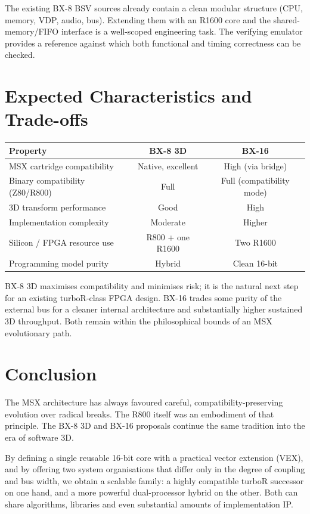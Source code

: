 \documentclass[11pt,a4paper]{article}
\begin{document}
The existing BX-8 BSV sources already contain a clean modular structure (CPU, memory, VDP, audio, bus). Extending them with an R1600 core and the shared-memory/FIFO interface is a well-scoped engineering task. The verifying emulator provides a reference against which both functional and timing correctness can be checked.

\section{Expected Characteristics and Trade-offs}

\begin{center}
\begin{tabular}{@{}lcc@{}}
\toprule
Property & BX-8 3D & BX-16 \\
\midrule
MSX cartridge compatibility & Native, excellent & High (via bridge) \\
Binary compatibility (Z80/R800) & Full & Full (compatibility mode) \\
3D transform performance & Good & High \\
Implementation complexity & Moderate & Higher \\
Silicon / FPGA resource use & R800 + one R1600 & Two R1600 \\
Programming model purity & Hybrid & Clean 16-bit \\
\bottomrule
\end{tabular}
\end{center}

BX-8 3D maximises compatibility and minimises risk; it is the natural next step for an existing turboR-class FPGA design. BX-16 trades some purity of the external bus for a cleaner internal architecture and substantially higher sustained 3D throughput. Both remain within the philosophical bounds of an MSX evolutionary path.

\section{Conclusion}

The MSX architecture has always favoured careful, compatibility-preserving evolution over radical breaks. The R800 itself was an embodiment of that principle. The BX-8 3D and BX-16 proposals continue the same tradition into the era of software 3D.

By defining a single reusable 16-bit core with a practical vector extension (VEX), and by offering two system organisations that differ only in the degree of coupling and bus width, we obtain a scalable family: a highly compatible turboR successor on one hand, and a more powerful dual-processor hybrid on the other. Both can share algorithms, libraries and even substantial amounts of implementation IP.
\end{document}
